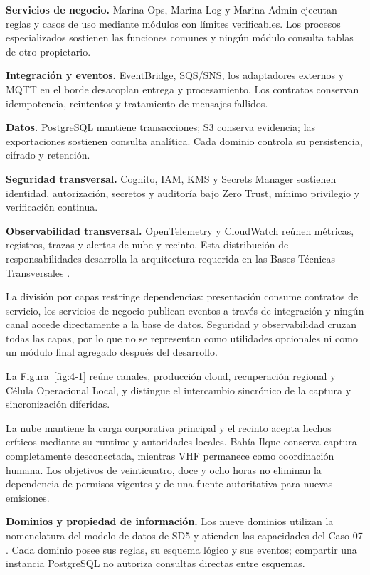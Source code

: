 \textbf{Servicios de negocio.} Marina-Ops, Marina-Log y Marina-Admin ejecutan reglas y casos de uso mediante módulos con límites verificables. Los procesos especializados sostienen las funciones comunes y ningún módulo consulta tablas de otro propietario.

\textbf{Integración y eventos.} EventBridge, SQS/SNS, los adaptadores externos y MQTT en el borde desacoplan entrega y procesamiento. Los contratos conservan idempotencia, reintentos y tratamiento de mensajes fallidos.

\textbf{Datos.} PostgreSQL mantiene transacciones; S3 conserva evidencia; las exportaciones sostienen consulta analítica. Cada dominio controla su persistencia, cifrado y retención.

\textbf{Seguridad transversal.} Cognito, IAM, KMS y Secrets Manager sostienen identidad, autorización, secretos y auditoría bajo Zero Trust, mínimo privilegio y verificación continua.

\textbf{Observabilidad transversal.} OpenTelemetry y CloudWatch reúnen métricas, registros, trazas y alertas de nube y recinto. Esta distribución de responsabilidades desarrolla la arquitectura requerida en las Bases Técnicas Transversales \parencite[cap.~2, pp.~6--7]{pucv-transversal}.

La división por capas restringe dependencias: presentación consume contratos de servicio, los servicios de negocio publican eventos a través de integración y ningún canal accede directamente a la base de datos. Seguridad y observabilidad cruzan todas las capas, por lo que no se representan como utilidades opcionales ni como un módulo final agregado después del desarrollo.

La Figura~\ref{fig:4-1} reúne canales, producción cloud, recuperación regional y Célula Operacional Local, y distingue el intercambio sincrónico de la captura y sincronización diferidas.



La nube mantiene la carga corporativa principal y el recinto acepta hechos críticos mediante su runtime y autoridades locales. Bahía Ilque conserva captura completamente desconectada, mientras VHF permanece como coordinación humana. Los objetivos de veinticuatro, doce y ocho horas no eliminan la dependencia de permisos vigentes y de una fuente autoritativa para nuevas emisiones.


\textbf{Dominios y propiedad de información.} Los nueve dominios utilizan la nomenclatura del modelo de datos de SD5 y atienden las capacidades del Caso 07 \parencite[caps.~4, 9 y 14]{caso07}. Cada dominio posee sus reglas, su esquema lógico y sus eventos; compartir una instancia PostgreSQL no autoriza consultas directas entre esquemas.

